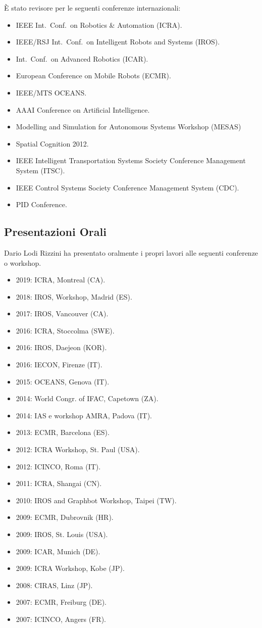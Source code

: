 \documentclass[11pt]{article}
\begin{document}
\noindent \`E stato revisore per le seguenti conferenze internazionali:
\begin{itemize}
\item IEEE Int.~Conf.~on Robotics \& Automation (ICRA).
\item IEEE/RSJ Int.~Conf.~on Intelligent Robots and Systems (IROS).
\item Int.~Conf.~on Advanced Robotics (ICAR).
\item European Conference on Mobile Robots (ECMR). 
\item IEEE/MTS OCEANS. 
\item AAAI Conference on Artificial Intelligence. 
\item Modelling and Simulation for Autonomous Systems Workshop (MESAS)
\item Spatial Cognition 2012.
\item IEEE Intelligent Transportation Systems Society Conference Management System (ITSC).
\item IEEE Control Systems Society Conference Management System (CDC).
\item PID Conference.
\end{itemize}

\subsection*{Presentazioni Orali}

Dario Lodi Rizzini ha presentato oralmente i propri lavori alle seguenti conferenze o workshop.
\begin{itemize}
\item 2019: ICRA, Montreal (CA).
\item 2018: IROS, Workshop, Madrid (ES).
\item 2017: IROS, Vancouver (CA).
\item 2016: ICRA, Stoccolma (SWE).
\item 2016: IROS, Daejeon (KOR).
\item 2016: IECON, Firenze (IT).
\item 2015: OCEANS, Genova (IT).
\item 2014: World Congr. of IFAC, Capetown (ZA).
\item 2014: IAS e workshop AMRA, Padova (IT).
\item 2013: ECMR, Barcelona (ES). 
\item 2012: ICRA Workshop, St. Paul (USA). 
\item 2012: ICINCO, Roma (IT). 
\item 2011: ICRA, Shangai (CN). 
\item 2010: IROS and Graphbot Workshop, Taipei (TW).
\item 2009: ECMR, Dubrovnik (HR).
\item 2009: IROS, St. Louis (USA).
\item 2009: ICAR, Munich (DE).
\item 2009: ICRA Workshop, Kobe (JP).
\item 2008: CIRAS, Linz (JP).
\item 2007: ECMR, Freiburg (DE).
\item 2007: ICINCO, Angers (FR).
\end{itemize}
\end{document}

